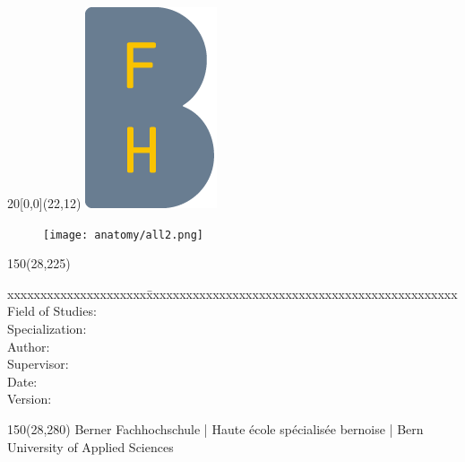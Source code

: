 
\begin{titlepage}

\setlength{\unitlength}{1mm}

\begin{textblock}{20}[0,0](22,12)
    \includegraphics{../img/BFH_Logo_B.png}
\end{textblock}

\begin{flushleft}

\vspace*{21mm}

\fontsize{24.88pt}{40pt}\selectfont
\textbf{\doctitle}
\vspace{2mm} 

\fontsize{17.28pt}{24pt}\selectfont\vspace{0.3em}
\docsubtitle
\vspace{6mm}

\begin{figure}[H]
    \texttt{[image: anatomy/all2.png]}
\end{figure}

\fontsize{10pt}{12pt}\selectfont
\begin{textblock}{150}(28,225)
\begin{tabbing}
xxxxxxxxxxxxxxxxxxxxx\=xxxxxxxxxxxxxxxxxxxxxxxxxxxxxxxxxxxxxxxxxxxxxxx \kill
Field of Studies:	\> \fieldofstudies	\\
Specialization:	    \> \specialisation	\\
Author:		        \> \docauthor \\
Supervisor:         \> \prof \\
Date:			    \> \versiondate \\
Version:		     \\
\end{tabbing}

\end{textblock}

\begin{textblock}{150}(28,280)
\noindent 
\color{bfhgrey}\fontsize{9pt}{10pt}\selectfont
Berner Fachhochschule | Haute \'ecole sp\'ecialis\'ee bernoise | Bern University of Applied Sciences
\color{black}\selectfont
\end{textblock}

\end{flushleft}

\end{titlepage}